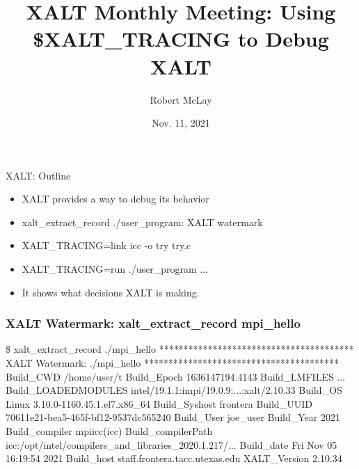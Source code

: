 \documentclass{beamer}
\begin{document}
\title[XALT]{XALT Monthly Meeting: Using \$XALT\_TRACING to Debug XALT}
\author{Robert McLay} 
\date{Nov. 11, 2021} 

\frame{\titlepage} 

\begin{frame}{XALT: Outline}
  \begin{itemize}
    \item XALT provides a way to debug its behavior
    \item xalt\_extract\_record ./user\_program: XALT watermark
    \item XALT\_TRACING=link  icc -o try try.c
    \item XALT\_TRACING=run ./user\_program ...
    \item It shows what decisions XALT is making.
  \end{itemize}
\end{frame}

\begin{frame}[fragile]
    \frametitle{XALT Watermark: xalt\_extract\_record mpi\_hello}
 {\tiny
    \begin{semiverbatim}
\$ xalt_extract_record ./mpi_hello 
****************************************
XALT Watermark: ./mpi_hello
****************************************
Build_CWD                /home/user/t
Build_Epoch              1636147194.4143
Build_LMFILES            ...
Build_LOADEDMODULES      intel/19.1.1:impi/19.0.9:...:xalt/2.10.33
Build_OS                 Linux 3.10.0-1160.45.1.el7.x86_64
Build_Syshost            frontera
Build_UUID               70611e21-bea5-465f-bf12-9537dc565240
Build_User               joe_user
Build_Year               2021
Build_compiler           mpiicc(icc)
Build_compilerPath       icc:/opt/intel/compilers_and_libraries_2020.1.217/...
Build_date               Fri Nov 05 16:19:54 2021
Build_host               staff.frontera.tacc.utexas.edu
XALT_Version             2.10.34
    \end{semiverbatim}
}
\end{frame}
\end{document}
